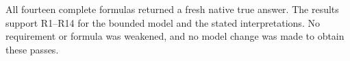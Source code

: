 All fourteen complete formulas returned a fresh native true answer. The results support R1--R14 for the bounded model and the stated interpretations. No requirement or formula was weakened, and no model change was made to obtain these passes.
